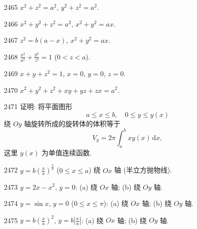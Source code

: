 \begin{prob}[S]{2465}
$x^2 + z^2 = a^2$, $y^2 + z^2 = a^2$.
\end{prob}

\begin{prob}[S]{2466}
$x^2 + y^2 + z^2 = a^2$, $x^2 + y^2 = ax$.
\end{prob}

\begin{prob}[S]{2467}
$z^2 = b(a - x)$, $x^2 + y^2 = ax$.
\end{prob}

\begin{prob}[S]{2468}
$\frac{x^2}{a^2} + \frac{y^2}{z^2} = 1$ ($0 < z < a$).
\end{prob}

\begin{prob}[S]{2469}
$x + y + z^2 = 1$, $x = 0$, $y = 0$, $z = 0$.
\end{prob}

\begin{prob}[S]{2470}
$x^2 + y^2 + z^2 + xy + yz + zx = a^2$.
\end{prob}

\begin{prob}[M]{2471}
证明: 将平面图形
\[
a \leqslant x \leqslant b, \quad 0 \leqslant y \leqslant y(x)
\]
绕 $Oy$ 轴旋转所成的旋转体的体积等于
\[
V_y = 2\pi\int_a^b xy(x)\,\mathrm{d}x,
\]
这里 $y(x)$ 为单值连续函数.
\end{prob}


\begin{prob}[S]{2472}
$y = b\left(\frac{x}{a}\right)^{\frac{2}{3}}$ ($0 \leqslant x \leqslant a$) 绕 $Ox$ 轴 (半立方抛物线).
\end{prob}

\begin{prob}[M]{2473}
$y = 2x - x^2$, $y = 0$: (a) 绕 $Ox$ 轴; \qquad (b) 绕 $Oy$ 轴.
\end{prob}

\begin{prob}[M]{2474}
$y = \sin x$, $y = 0$ ($0 \leqslant x \leqslant \pi$): (a) 绕 $Ox$ 轴; \qquad (b) 绕 $Oy$ 轴.
\end{prob}

\begin{prob}[M]{2475}
$y = b\left(\frac{x}{a}\right)^2$, $y = b\left|\frac{x}{a}\right|$: (a) 绕 $Ox$ 轴; \qquad (b) 绕 $Oy$ 轴.
\end{prob}

